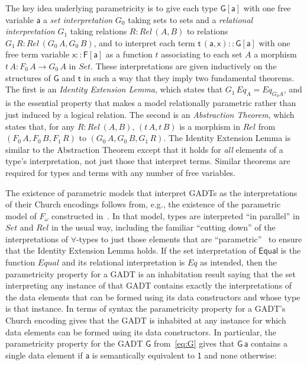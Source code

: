 \documentclass[acmsmall,screen,review,anonymous]{acmart}
\theoremstyle{definition}
\begin{document}
The key idea underlying parametricity is to give each type
$\mathsf{G[a]}$ with one free variable $\mathsf{a}$ a {\em set
  interpretation} $G_0$ taking sets to sets and a \emph{relational
  interpretation} $G_1$ taking relations $R : \mathit{Rel}\,(A,B)$ to
relations $G_1 \,R : \mathit{Rel}\,(G_0 \,A, G_0 \,B)$, and to
interpret each term $\mathsf{t\,(a,x) :: G[a]}$ with one free term
variable $\mathsf{x :: F[a]}$ as a function $t$ associating to each
set $A$ a morphism $t \,A : F_0\,A \to G_0\,A$ in $\mathit{Set}$.
These interpretations are given inductively on the structures of
$\mathsf{G}$ and $\mathsf{t}$ in such a way that they imply two
fundamental theorems. The first is an \emph{Identity Extension Lemma},
which states that $G_1\,\mathit{Eq}_A = \mathit{Eq}_{G_0 A}$, and is
the essential property that makes a model relationally parametric
rather than just induced by a logical relation.  The second is an
\emph{Abstraction Theorem}, which states that, for any $R
:\mathit{Rel}\,(A, B)$, $(t\, A, t\,B)$ is a morphism in
$\mathit{Rel}$ from $(F_0\,A,F_0\,B,F_1\,R)$ to
$(G_0\,A,G_0\,B,G_1\,R)$. The Identity Extension Lemma is similar to
the Abstraction Theorem except that it holds for {\em all} elements of
a type's interpretation, not just those that interpret terms.  Similar
theorems are required for types and terms with any number of free
variables.

The existence of parametric models that interpret GADTs as the
interpretations of their Church encodings follows from, e.g., the
existence of the parametric model of $F_\omega$ constructed
in~\cite{atk12}.  In that model, types are interpreted ``in parallel''
in $\mathit{Set}$ and $\mathit{Rel}$ in the usual way, including the
familiar ``cutting down'' of the interpretations of $\forall$-types to
just those elements that are ``parametric''~\cite{rey83,wad89} to
ensure that the Identity Extension Lemma holds. If {\color{blue} the
  set interpretation of $\mathsf{Equal}$ is the function
  $\mathit{Equal}$ and its relational interpretation is $\mathit{Eq}$}
as intended, then the parametricity property for a GADT is an
inhabitation result saying that the set interpreting any instance of
that GADT contains exactly the interpretations of the data elements
that can be formed using its data constructors and whose type is that
instance. In terms of syntax the parametricity property for a GADT's
Church encoding gives that the GADT is inhabited at any instance for
which data elements can be formed using its data constructors. In
particular, the parametricity property for the GADT $\mathsf{G}$
from~\eqref{eq:G} gives that $\mathsf{G\,a}$ contains a single data
element if $\mathsf{a}$ is semantically equivalent to $\mathsf{1}$ and
none otherwise:
\end{document}
